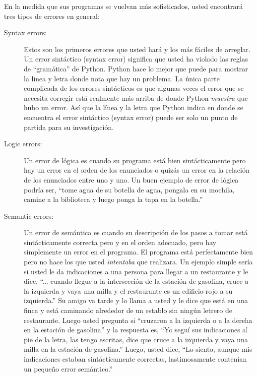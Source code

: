 En la medida que sus programas se vuelvan m\'as sofisticados, usted encontrar\'a tres tipos de errores en general:

\begin{description}

\item[Syntax errors:] Estos son los primeros errores que usted har\'a y los m\'as f\'aciles de arreglar. Un error sint\'actico (syntax error) significa que usted ha violado las reglas de ``gram\'atica'' de Python.
Python hace lo mejor que puede para mostrar la l\'inea y letra donde nota que hay un problema. La \'unica parte complicada de los errores sint\'acticos es que algunas veces el error que se necesita corregir est\'a realmente m\'as arriba de donde Python 
{\em muestra} que hubo un error. As\'i que la l\'inea y la letra que Python indica en donde se encuentra el error sint\'actico (syntax error) puede ser solo un punto de partida para su investigaci\'on.

\item[Logic errors:] Un error de l\'ogica es cuando su programa est\'a bien sint\'acticamente pero hay un error en el orden de los enunciados o quiz\'as un error en la relaci\'on de los enunciados entre uno y uno. Un buen ejemplo de error de l\'ogica podr\'ia ser, ``tome agua de su botella de agua, pongala en su mochila, camine a la biblioteca y luego ponga la tapa en la botella.''

\item[Semantic errors:] Un error de sem\'antica es cuando su descripci\'on de los pasos a tomar est\'a sint\'acticamente correcta pero y en el orden adecuado, pero hay simplemente un error en el programa. El programa est\'a perfectamente bien pero no hace los que usted {\em intentaba} que realizara. Un ejemplo simple ser\'ia si usted le da indicaciones a una persona para llegar a un restaurante y le dice, ``... cuando llegue a la intersecci\'on de la estaci\'on de gasolina, cruce a la izquierda y vaya una milla y el restaurante es un edificio rojo a su izquierda.'' Su amigo va tarde y lo llama a usted y le dice que est\'a en una finca y est\'a caminando alrededor de un establo sin ning\'un letrero de restaurante.  
Luego usted pregunta si ``cruzaron a la izquierda o a la dereha en la estaci\'on de gasolina'' y la respuesta es, ``Yo segu\'i sus indicaciones al pie de la letra, las tengo escritas, dice que cruce a la izquierda y vaya una milla en la estaci\'on de gasolina.'' Luego, usted dice,
``Lo siento, aunque mis indicaciones estaban sint\'acticamente correctas, lastimosamente conten\'ian un peque\~no error sem\'antico.'' 

\end{description}

